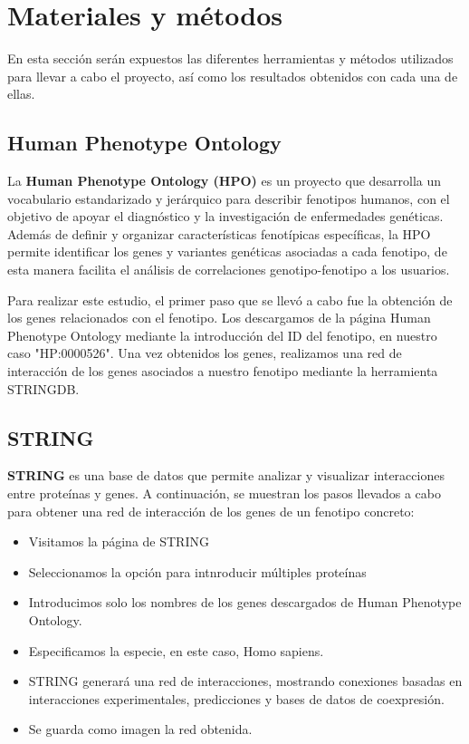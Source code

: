 \section{Materiales y métodos}

En esta sección serán expuestos las diferentes herramientas y métodos utilizados para llevar a cabo el proyecto, así como los resultados obtenidos con cada una de ellas.

\subsection{Human Phenotype Ontology}

La \textbf{Human Phenotype Ontology (HPO)} es un proyecto que desarrolla un vocabulario estandarizado y jerárquico para describir fenotipos humanos, con el objetivo de apoyar el diagnóstico y la investigación de enfermedades genéticas. Además de definir y organizar características fenotípicas específicas, la HPO permite identificar los genes y variantes genéticas asociadas a cada fenotipo, de esta manera facilita el análisis de correlaciones genotipo-fenotipo a los usuarios.

Para realizar este estudio, el primer paso que se llevó a cabo fue la obtención de los genes relacionados con el fenotipo. Los descargamos de la página Human Phenotype Ontology mediante la introducción del ID del fenotipo, en nuestro caso "HP:0000526". Una vez obtenidos los genes, realizamos una red de interacción de los genes asociados a nuestro fenotipo mediante la herramienta STRINGDB.
 

\subsection{STRING}


\textbf{STRING} es una base de datos que permite analizar y visualizar interacciones entre proteínas y genes. A continuación, se muestran los pasos llevados a cabo para obtener una red de interacción de los genes de un fenotipo concreto:

\begin{itemize}
	\item Visitamos la página de STRING
	\item Seleccionamos la opción para intnroducir múltiples proteínas
	\item Introducimos solo los nombres de los genes descargados de Human Phenotype Ontology.
	\item Especificamos la especie, en este caso, Homo sapiens.
	\item STRING generará una red de interacciones, mostrando conexiones basadas en interacciones experimentales, predicciones y bases de datos de coexpresión.
	\item Se guarda como imagen la red obtenida.
\end{itemize}

